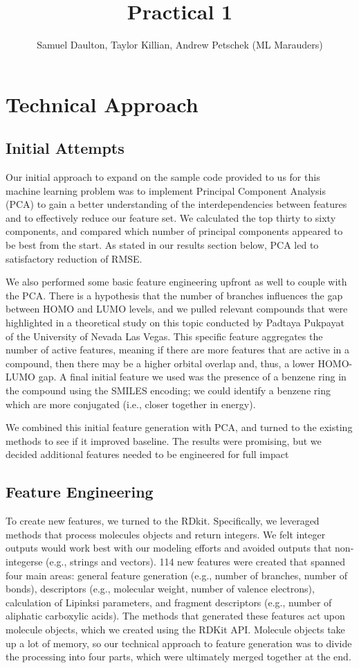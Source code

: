 \documentclass[11pt, oneside]{article}   	%
\title{Practical 1}
\author{Samuel Daulton, Taylor Killian, Andrew Petschek (ML Marauders)}
\begin{document}
\maketitle
\section{Technical Approach}
\subsection{Initial Attempts} 
Our initial approach to expand on the sample code provided to us for this machine learning problem was to implement Principal Component Analysis (PCA) to gain a better understanding of the interdependencies between features and to effectively reduce our feature set. We calculated the top thirty to sixty components, and compared which number of principal components appeared to be best from the start. As stated in our results section below, PCA led to satisfactory reduction of RMSE. 

We also performed some basic feature engineering upfront as well to couple with the PCA. There is a hypothesis that the number of branches influences the gap between HOMO and LUMO levels, and we pulled relevant compounds that were highlighted in a theoretical study on this topic conducted by Padtaya Pukpayat of the University of Nevada Las Vegas. This specific feature aggregates the number of active features, meaning if there are more features that are active in a compound, then there may be a higher orbital overlap and, thus, a lower HOMO-LUMO gap. A final initial feature we used was the presence of a benzene ring in the compound using the SMILES encoding; we could identify a benzene ring  which are more conjugated (i.e., closer together in energy). 

We combined this initial feature generation with PCA, and turned to the existing methods to see if it improved baseline. The results were promising, but we decided additional features needed to be engineered for full impact 

\subsection{Feature Engineering} 

To create new features, we turned to the RDkit. Specifically, we leveraged methods that process molecules objects and return integers. We felt integer outputs would work best with our modeling efforts and avoided outputs that non-integerse (e.g., strings and vectors). 114 new features were created that spanned four main areas: general feature generation (e.g., number of branches, number of bonds), descriptors (e.g., molecular weight, number of valence electrons), calculation of Lipinksi parameters, and fragment descriptors (e.g., number of aliphatic carboxylic acids). The methods that generated these features act upon molecule objects, which we created using the RDKit API. Molecule objects take up a lot of memory, so our technical approach to feature generation was to divide the processing into four parts, which were ultimately merged together at the end. 
\end{document}

